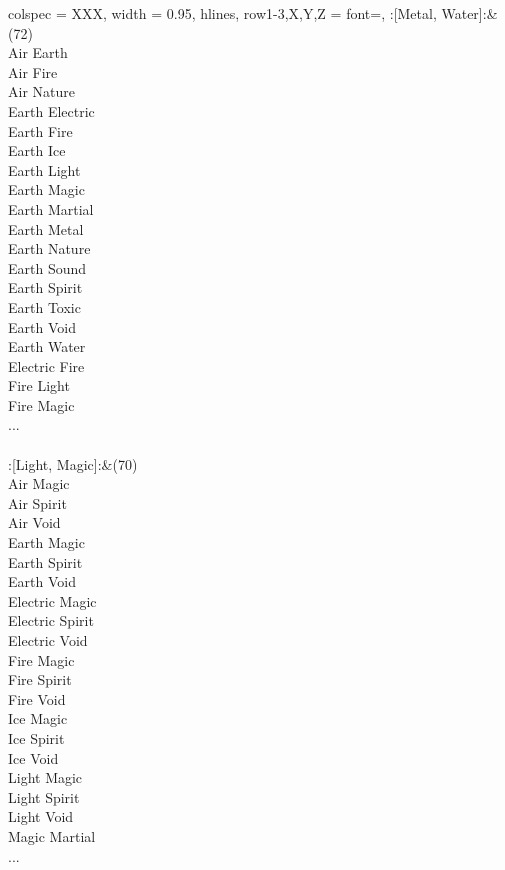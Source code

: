 \begin{longtblr}[
	caption = {2v2 Defending Weak},
	label = {2v2-Defending-Weak},
]{
	colspec = {XXX}, width = 0.95\linewidth,
	hlines,
	row{1-3,X,Y,Z} = {font=\bfseries},
}
	:[Metal, Water]:&{(72)\\
	Air Earth \\
	Air Fire \\
	Air Nature \\
	Earth Electric \\
	Earth Fire \\
	Earth Ice \\
	Earth Light \\
	Earth Magic \\
	Earth Martial \\
	Earth Metal \\
	Earth Nature \\
	Earth Sound \\
	Earth Spirit \\
	Earth Toxic \\
	Earth Void \\
	Earth Water \\
	Electric Fire \\
	Fire Light \\
	Fire Magic \\
	...\\
	}\\

	:[Light, Magic]:&{(70)\\
	Air Magic \\
	Air Spirit \\
	Air Void \\
	Earth Magic \\
	Earth Spirit \\
	Earth Void \\
	Electric Magic \\
	Electric Spirit \\
	Electric Void \\
	Fire Magic \\
	Fire Spirit \\
	Fire Void \\
	Ice Magic \\
	Ice Spirit \\
	Ice Void \\
	Light Magic \\
	Light Spirit \\
	Light Void \\
	Magic Martial \\
	...\\
	}\\


\end{longtblr}
